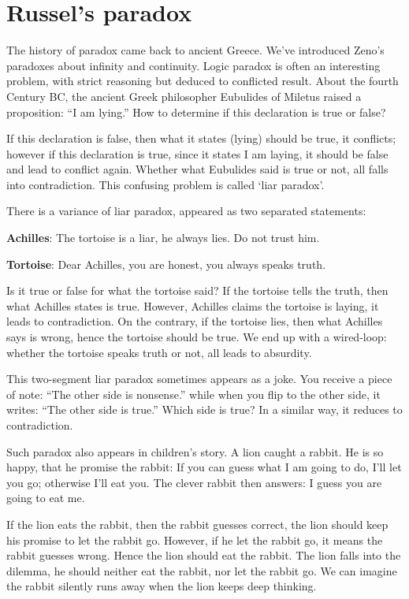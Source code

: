 \documentclass{article}
\begin{document}
\section{Russel's paradox}

The history of paradox came back to ancient Greece. We've introduced Zeno's paradoxes about infinity and continuity. Logic paradox is often an interesting problem, with strict reasoning but deduced to conflicted result. About the fourth Century BC, the ancient Greek philosopher Eubulides of Miletus raised a proposition: ``I am lying.'' How to determine if this declaration is true or false?

If this declaration is false, then what it states (lying) should be true, it conflicts; however if this declaration is true, since it states I am laying, it should be false and lead to conflict again. Whether what Eubulides said is true or not, all falls into contradiction. This confusing problem is called `liar paradox'.

There is a variance of liar paradox, appeared as two separated statements:

\textbf{Achilles}: The tortoise is a liar, he always lies. Do not trust him.

\textbf{Tortoise}: Dear Achilles, you are honest, you always speaks truth.

Is it true or false for what the tortoise said? If the tortoise tells the truth, then what Achilles states is true. However, Achilles claims the tortoise is laying, it leads to contradiction. On the contrary, if the tortoise lies, then what Achilles says is wrong, hence the tortoise should be true. We end up with a wired-loop: whether the tortoise speaks truth or not, all leads to absurdity.

This two-segment liar paradox sometimes appears as a joke. You receive a piece of note: ``The other side is nonsense.'' while when you flip to the other side, it writes: ``The other side is true.'' Which side is true? In a similar way, it reduces to contradiction.

Such paradox also appears in children's story. A lion caught a rabbit. He is so happy, that he promise the rabbit: If you can guess what I am going to do, I'll let you go; otherwise I'll eat you. The clever rabbit then answers: I guess you are going to eat me.

If the lion eats the rabbit, then the rabbit guesses correct, the lion should keep his promise to let the rabbit go. However, if he let the rabbit go, it means the rabbit guesses wrong. Hence the lion should eat the rabbit. The lion falls into the dilemma, he should neither eat the rabbit, nor let the rabbit go. We can imagine the rabbit silently runs away when the lion keeps deep thinking.
\end{document}
